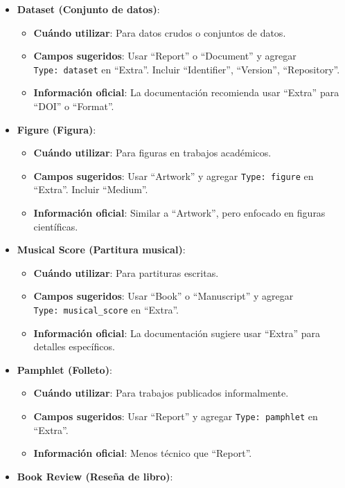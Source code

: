 \documentclass[
  jou,
  floatsintext,
  longtable,
  a4paper,
  nolmodern,
  notxfonts,
  notimes,
  colorlinks=true,linkcolor=blue,citecolor=blue,urlcolor=blue]{apa7}
\providecommand{\tightlist}{%
  \setlength{\itemsep}{0pt}\setlength{\parskip}{0pt}}
\begin{document}
\begin{itemize}
\tightlist
\item
  \textbf{Dataset (Conjunto de datos)}:

  \begin{itemize}
  \tightlist
  \item
    \textbf{Cuándo utilizar}: Para datos crudos o conjuntos de datos.
  \item
    \textbf{Campos sugeridos}: Usar ``Report'' o ``Document'' y agregar
    \texttt{Type:\ dataset} en ``Extra''. Incluir ``Identifier'',
    ``Version'', ``Repository''.
  \item
    \textbf{Información oficial}: La documentación recomienda usar
    ``Extra'' para ``DOI'' o ``Format''.
  \end{itemize}
\item
  \textbf{Figure (Figura)}:

  \begin{itemize}
  \tightlist
  \item
    \textbf{Cuándo utilizar}: Para figuras en trabajos académicos.
  \item
    \textbf{Campos sugeridos}: Usar ``Artwork'' y agregar
    \texttt{Type:\ figure} en ``Extra''. Incluir ``Medium''.
  \item
    \textbf{Información oficial}: Similar a ``Artwork'', pero enfocado
    en figuras científicas.
  \end{itemize}
\item
  \textbf{Musical Score (Partitura musical)}:

  \begin{itemize}
  \tightlist
  \item
    \textbf{Cuándo utilizar}: Para partituras escritas.
  \item
    \textbf{Campos sugeridos}: Usar ``Book'' o ``Manuscript'' y agregar
    \texttt{Type:\ musical\_score} en ``Extra''.
  \item
    \textbf{Información oficial}: La documentación sugiere usar
    ``Extra'' para detalles específicos.
  \end{itemize}
\item
  \textbf{Pamphlet (Folleto)}:

  \begin{itemize}
  \tightlist
  \item
    \textbf{Cuándo utilizar}: Para trabajos publicados informalmente.
  \item
    \textbf{Campos sugeridos}: Usar ``Report'' y agregar
    \texttt{Type:\ pamphlet} en ``Extra''.
  \item
    \textbf{Información oficial}: Menos técnico que ``Report''.
  \end{itemize}
\item
  \textbf{Book Review (Reseña de libro)}:


\end{itemize}
\end{document}
